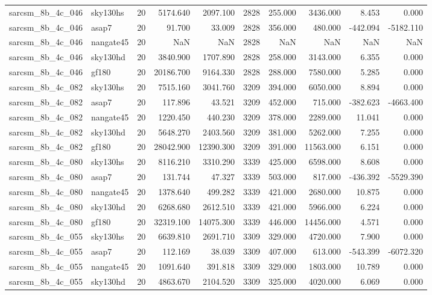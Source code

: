 \begin{tabular}{llrrrrrrrr}
sarcsm\_8b\_4c\_046 & sky130hs & 20 & 5174.640 & 2097.100 & 2828 & 255.000 & 3436.000 & 8.453 & 0.000 \\
sarcsm\_8b\_4c\_046 & asap7 & 20 & 91.700 & 33.009 & 2828 & 356.000 & 480.000 & -442.094 & -5182.110 \\
sarcsm\_8b\_4c\_046 & nangate45 & 20 & NaN & NaN & 2828 & NaN & NaN & NaN & NaN \\
sarcsm\_8b\_4c\_046 & sky130hd & 20 & 3840.900 & 1707.890 & 2828 & 258.000 & 3143.000 & 6.355 & 0.000 \\
sarcsm\_8b\_4c\_046 & gf180 & 20 & 20186.700 & 9164.330 & 2828 & 288.000 & 7580.000 & 5.285 & 0.000 \\
sarcsm\_8b\_4c\_082 & sky130hs & 20 & 7515.160 & 3041.760 & 3209 & 394.000 & 6050.000 & 8.894 & 0.000 \\
sarcsm\_8b\_4c\_082 & asap7 & 20 & 117.896 & 43.521 & 3209 & 452.000 & 715.000 & -382.623 & -4663.400 \\
sarcsm\_8b\_4c\_082 & nangate45 & 20 & 1220.450 & 440.230 & 3209 & 378.000 & 2289.000 & 11.041 & 0.000 \\
sarcsm\_8b\_4c\_082 & sky130hd & 20 & 5648.270 & 2403.560 & 3209 & 381.000 & 5262.000 & 7.255 & 0.000 \\
sarcsm\_8b\_4c\_082 & gf180 & 20 & 28042.900 & 12390.300 & 3209 & 391.000 & 11563.000 & 6.151 & 0.000 \\
sarcsm\_8b\_4c\_080 & sky130hs & 20 & 8116.210 & 3310.290 & 3339 & 425.000 & 6598.000 & 8.608 & 0.000 \\
sarcsm\_8b\_4c\_080 & asap7 & 20 & 131.744 & 47.327 & 3339 & 503.000 & 817.000 & -436.392 & -5529.390 \\
sarcsm\_8b\_4c\_080 & nangate45 & 20 & 1378.640 & 499.282 & 3339 & 421.000 & 2680.000 & 10.875 & 0.000 \\
sarcsm\_8b\_4c\_080 & sky130hd & 20 & 6268.680 & 2612.510 & 3339 & 421.000 & 5966.000 & 6.224 & 0.000 \\
sarcsm\_8b\_4c\_080 & gf180 & 20 & 32319.100 & 14075.300 & 3339 & 446.000 & 14456.000 & 4.571 & 0.000 \\
sarcsm\_8b\_4c\_055 & sky130hs & 20 & 6639.810 & 2691.710 & 3309 & 329.000 & 4720.000 & 7.900 & 0.000 \\
sarcsm\_8b\_4c\_055 & asap7 & 20 & 112.169 & 38.039 & 3309 & 407.000 & 613.000 & -543.399 & -6072.320 \\
sarcsm\_8b\_4c\_055 & nangate45 & 20 & 1091.640 & 391.818 & 3309 & 329.000 & 1803.000 & 10.789 & 0.000 \\
sarcsm\_8b\_4c\_055 & sky130hd & 20 & 4863.670 & 2104.520 & 3309 & 325.000 & 4020.000 & 6.069 & 0.000 \\

\end{tabular}
